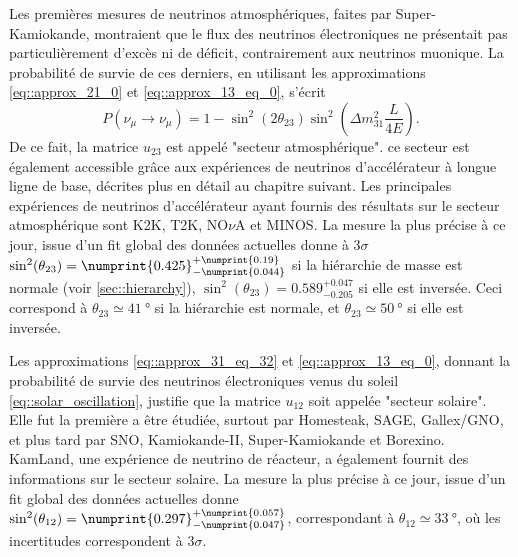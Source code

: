 		    Les premières mesures de neutrinos atmosphériques, faites par Super-Kamiokande\cite{Fukuda1998}, montraient que le flux des neutrinos électroniques ne présentait pas particulièrement d'excès ni de déficit, contrairement aux neutrinos muonique. La probabilité de survie de ces derniers, en utilisant les approximations \eqref{eq::approx_21_0} et \eqref{eq::approx_13_eq_0}, s'écrit
		    \begin{equation}
		    P(\nu_{\mu}\to\nu_{\mu}) = 1 - \sin^2(2\theta_{23})\sin^2\left(\Delta m^2_{31}\frac{L}{4E}\right).
		    \end{equation}
		    De ce fait, la matrice $u_{23}$ est appelé "secteur atmosphérique". ce secteur est également accessible grâce aux expériences de neutrinos d'accélérateur à longue ligne de base, décrites plus en détail au chapitre suivant. Les principales expériences de neutrinos d'accélérateur ayant fournis des résultats sur le secteur atmosphérique sont K2K\cite{Collaboration2006a}, T2K\cite{Abe2018}, NO$\nu$A\cite{Adamson2016} et MINOS\cite{Collaboration2014}. La mesure la plus précise à ce jour, issue d'un fit global des données actuelles donne à $3\sigma$ $\sin^2(\theta_{23})=\numprint{0.425}^{+\numprint{0.19}}_{-\numprint{0.044}}$\cite{pdg2018} si la hiérarchie de masse est normale (voir \autoref{sec::hierarchy}), $\sin^2(\theta_{23})=0.589^{+0.047}_{-0.205}$ si elle est inversée. Ceci correspond à $\theta_{23}\simeq\SI{41}{\degree}$ si la hiérarchie est normale, et $\theta_{23}\simeq\SI{50}{\degree}$ si elle est inversée.
		    
		    Les approximations \eqref{eq::approx_31_eq_32} et \eqref{eq::approx_13_eq_0}, donnant la probabilité de survie des neutrinos électroniques venus du soleil \eqref{eq::solar_oscillation}, justifie que la matrice $u_{12}$ soit appelée "secteur solaire". Elle fut la première a être étudiée, surtout par Homesteak\cite{Lande1990}, SAGE\cite{Collaboration2009}, Gallex/GNO\cite{Hampel1999}, et plus tard par SNO\cite{Aharmim2013},  Kamiokande-II\cite{Hirata1992}, Super-Kamiokande\cite{Abe2018} et Borexino\cite{Collaboration2013}. KamLand\cite{Collaboration2004}, une expérience de neutrino de réacteur, a également fournit des informations sur le secteur solaire. La mesure la plus précise à ce jour, issue d'un fit global des données actuelles donne $\sin^2(\theta_{12})=\numprint{0.297}^{+\numprint{0.057}}_{-\numprint{0.047}}$\cite{pdg2018}, correspondant à $\theta_{12}\simeq\SI{33}{\degree}$, où les incertitudes correspondent à $3\sigma$.
		    
